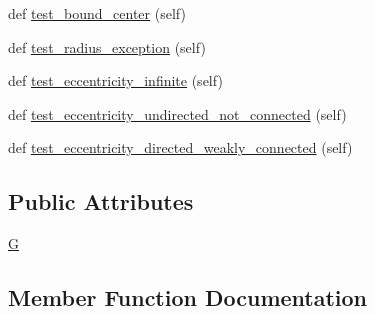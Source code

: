 \begin{DoxyCompactItemize}
\item 
def \hyperlink{classnetworkx_1_1algorithms_1_1tests_1_1test__distance__measures_1_1TestDistance_a71571c744756dcdf61555b14b9ba52ee}{test\+\_\+bound\+\_\+center} (self)
\item 
def \hyperlink{classnetworkx_1_1algorithms_1_1tests_1_1test__distance__measures_1_1TestDistance_a353838eb457724e3d4505f535803edaa}{test\+\_\+radius\+\_\+exception} (self)
\item 
def \hyperlink{classnetworkx_1_1algorithms_1_1tests_1_1test__distance__measures_1_1TestDistance_abc4739cffec4ff1a7f19c63beb1f5eb8}{test\+\_\+eccentricity\+\_\+infinite} (self)
\item 
def \hyperlink{classnetworkx_1_1algorithms_1_1tests_1_1test__distance__measures_1_1TestDistance_ad4305bcc8563aecd6ea61d1481e8326c}{test\+\_\+eccentricity\+\_\+undirected\+\_\+not\+\_\+connected} (self)
\item 
def \hyperlink{classnetworkx_1_1algorithms_1_1tests_1_1test__distance__measures_1_1TestDistance_a2eb09b07d6e673dd07c970a0d324f30a}{test\+\_\+eccentricity\+\_\+directed\+\_\+weakly\+\_\+connected} (self)
\end{DoxyCompactItemize}
\subsection*{Public Attributes}
\begin{DoxyCompactItemize}
\item 
\hyperlink{classnetworkx_1_1algorithms_1_1tests_1_1test__distance__measures_1_1TestDistance_ac2c5b3a68e0e47ff659b8ef039b14049}{G}
\end{DoxyCompactItemize}


\subsection{Member Function Documentation}
\mbox{\label{classnetworkx_1_1algorithms_1_1tests_1_1test__distance__measures_1_1TestDistance_acaa2a2d854662a22f081fd8b49706e5e}} 
